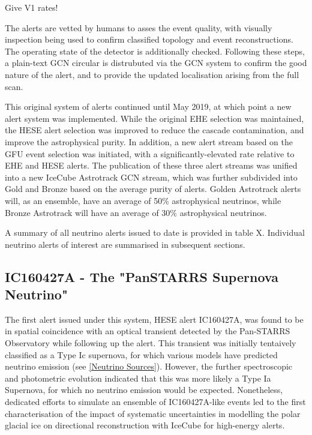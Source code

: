 Give V1 rates!

The alerts are vetted by humans to asses the event quality, with visually inspection being used to confirm classified topology and event reconstructions. The operating state of the detector is additionally checked. Following these steps, a plain-text GCN circular is distrubuted via the GCN system to confirm the good nature of the alert, and to provide the updated localisation arising from the full scan. 

This original system of alerts continued until May 2019, at which point a new alert system was implemented. While the original EHE selection was maintained, the HESE alert selection was improved to reduce the cascade contamination, and improve the astrophysical purity. In addition, a new alert stream based on the GFU event selection was initiated, with a significantly-elevated rate relative to EHE and HESE alerts. The publication of these three alert streams was unified into a new IceCube Astrotrack GCN stream, which was further subdivided into Gold and Bronze based on the average purity of alerts. Golden Astrotrack alerts will, as an ensemble, have an average of 50\% astrophysical neutrinos, while Bronze Astrotrack will have an average of 30\% astrophysical neutrinos.

A summary of all neutrino alerts issued to date is provided in table X. Individual neutrino alerts of interest are summarised in subsequent sections. 

\subsection{IC160427A - The "PanSTARRS Supernova Neutrino"}

The first alert issued under this system, HESE alert IC160427A, was found to be in spatial coincidence with an optical transient detected by the Pan-STARRS Observatory while following up the alert. This transient was initially tentaively classified as a Type Ic supernova, for which various models have predicted neutrino emission (see \ref{Neutrino Sources}).  However, the further spectroscopic and photometric evolution indicated that this was  more likely a Type Ia Supernova, for which no neutrino emission would be expected. Nonetheless, dedicated efforts to simulate an ensemble of IC160427A-like events led to the first characterisation of the impact of systematic uncertainties in modelling the polar glacial ice on directional reconstruction with IceCube for high-energy alerts. 


